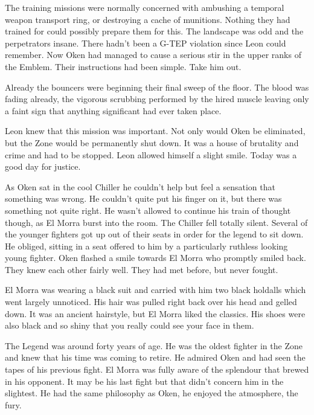The training missions were normally concerned with ambushing a temporal weapon transport ring, or destroying a cache of munitions.  Nothing they had trained for could possibly prepare them for this.  The landscape was odd and the perpetrators insane.  There hadn't been a G-TEP violation since Leon could remember.  Now Oken had managed to cause a serious stir in the upper ranks of the Emblem.  Their instructions had been simple.  Take him out.  

Already the bouncers were beginning their final sweep of the floor.  The blood was fading already, the vigorous scrubbing performed by the hired muscle leaving only a faint sign that anything significant had ever taken place. 

Leon knew that this mission was important.  Not only would Oken be eliminated, but the Zone would be permanently shut down.  It was a house of brutality and crime and had to be stopped.  Leon allowed himself a slight smile.  Today was a good day for justice.



\thoughtbreak 



As Oken sat in the cool Chiller he couldn't help but feel a sensation that something was wrong.  He couldn't quite put his finger on it, but there was something not quite right.  He wasn't allowed to continue his train of thought though, as El Morra burst into the room.  The Chiller fell totally silent.  Several of the younger fighters got up out of their seats in order for the legend to sit down.  He obliged, sitting in a seat offered to him by a particularly ruthless looking young fighter.  Oken flashed a smile towards El Morra who promptly smiled back.  They knew each other fairly well.  They had met before, but never fought.  

El Morra was wearing a black suit and carried with him two black holdalls which went largely unnoticed.  His hair was pulled right back over his head and gelled down.  It was an ancient hairstyle, but El Morra liked the classics.  His shoes were also black and so shiny that you really could see your face in them.

The Legend was around forty years of age.  He was the oldest fighter in the Zone and knew that his time was coming to retire.  He admired Oken and had seen the tapes of his previous fight.  El Morra was fully aware of the splendour that brewed in his opponent.  It may be his last fight but that didn't concern him in the slightest.  He had the same philosophy as Oken, he enjoyed the atmosphere, the fury.

